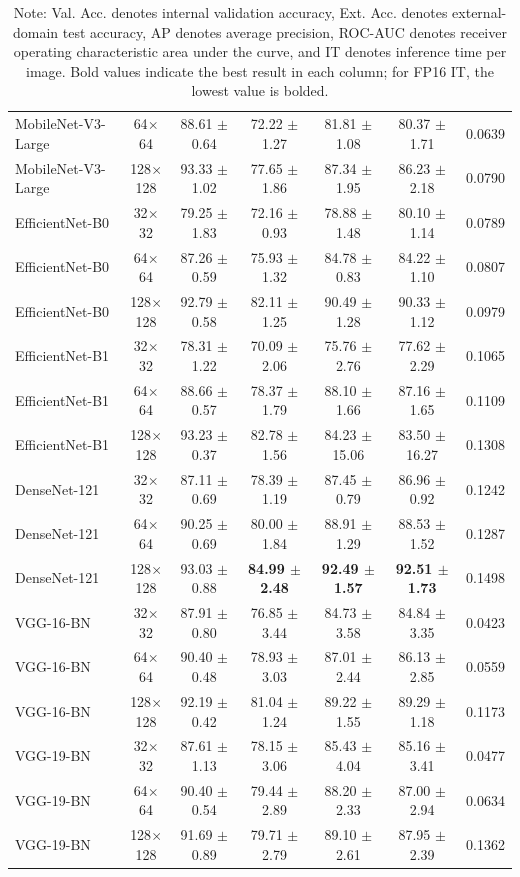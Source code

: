 \documentclass[conference]{IEEEtran}
\begin{document}
\begin{table}[!t]
{\begin{tabular}{lcccccc}
MobileNet-V3-Large & 64$\times$64 & 88.61 $\pm$ 0.64 & 72.22 $\pm$ 1.27 & 81.81 $\pm$ 1.08 & 80.37 $\pm$ 1.71 & 0.0639 \\
MobileNet-V3-Large & 128$\times$128 & 93.33 $\pm$ 1.02 & 77.65 $\pm$ 1.86 & 87.34 $\pm$ 1.95 & 86.23 $\pm$ 2.18 & 0.0790 \\
\hline
EfficientNet-B0 & 32$\times$32 & 79.25 $\pm$ 1.83 & 72.16 $\pm$ 0.93 & 78.88 $\pm$ 1.48 & 80.10 $\pm$ 1.14 & 0.0789 \\
EfficientNet-B0 & 64$\times$64 & 87.26 $\pm$ 0.59 & 75.93 $\pm$ 1.32 & 84.78 $\pm$ 0.83 & 84.22 $\pm$ 1.10 & 0.0807 \\
EfficientNet-B0 & 128$\times$128 & 92.79 $\pm$ 0.58 & 82.11 $\pm$ 1.25 & 90.49 $\pm$ 1.28 & 90.33 $\pm$ 1.12 & 0.0979 \\
\hline
EfficientNet-B1 & 32$\times$32 & 78.31 $\pm$ 1.22 & 70.09 $\pm$ 2.06 & 75.76 $\pm$ 2.76 & 77.62 $\pm$ 2.29 & 0.1065 \\
EfficientNet-B1 & 64$\times$64 & 88.66 $\pm$ 0.57 & 78.37 $\pm$ 1.79 & 88.10 $\pm$ 1.66 & 87.16 $\pm$ 1.65 & 0.1109 \\
EfficientNet-B1 & 128$\times$128 & 93.23 $\pm$ 0.37 & 82.78 $\pm$ 1.56 & 84.23 $\pm$ 15.06 & 83.50 $\pm$ 16.27 & 0.1308 \\
\hline
DenseNet-121 & 32$\times$32 & 87.11 $\pm$ 0.69 & 78.39 $\pm$ 1.19 & 87.45 $\pm$ 0.79 & 86.96 $\pm$ 0.92 & 0.1242 \\
DenseNet-121 & 64$\times$64 & 90.25 $\pm$ 0.69 & 80.00 $\pm$ 1.84 & 88.91 $\pm$ 1.29 & 88.53 $\pm$ 1.52 & 0.1287 \\
DenseNet-121 & 128$\times$128 & 93.03 $\pm$ 0.88 & \textbf{84.99 $\pm$ 2.48} & \textbf{92.49 $\pm$ 1.57} & \textbf{92.51 $\pm$ 1.73} & 0.1498 \\
\hline
VGG-16-BN & 32$\times$32 & 87.91 $\pm$ 0.80 & 76.85 $\pm$ 3.44 & 84.73 $\pm$ 3.58 & 84.84 $\pm$ 3.35 & 0.0423 \\
VGG-16-BN & 64$\times$64 & 90.40 $\pm$ 0.48 & 78.93 $\pm$ 3.03 & 87.01 $\pm$ 2.44 & 86.13 $\pm$ 2.85 & 0.0559 \\
VGG-16-BN & 128$\times$128 & 92.19 $\pm$ 0.42 & 81.04 $\pm$ 1.24 & 89.22 $\pm$ 1.55 & 89.29 $\pm$ 1.18 & 0.1173 \\
\hline
VGG-19-BN & 32$\times$32 & 87.61 $\pm$ 1.13 & 78.15 $\pm$ 3.06 & 85.43 $\pm$ 4.04 & 85.16 $\pm$ 3.41 & 0.0477 \\
VGG-19-BN & 64$\times$64 & 90.40 $\pm$ 0.54 & 79.44 $\pm$ 2.89 & 88.20 $\pm$ 2.33 & 87.00 $\pm$ 2.94 & 0.0634 \\
VGG-19-BN & 128$\times$128 & 91.69 $\pm$ 0.89 & 79.71 $\pm$ 2.79 & 89.10 $\pm$ 2.61 & 87.95 $\pm$ 2.39 & 0.1362 \\
\hline
\end{tabular}
}
\caption*{\footnotesize Note: Val. Acc. denotes internal validation accuracy, Ext. Acc. denotes external-domain test accuracy, AP denotes average precision, ROC-AUC denotes receiver operating characteristic area under the curve, and IT denotes inference time per image. Bold values indicate the best result in each column; for FP16 IT, the lowest value is bolded.}
\end{table}
\end{document}
